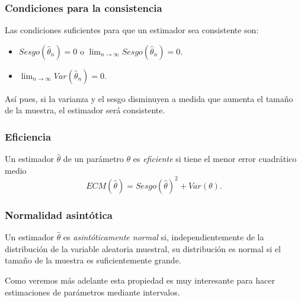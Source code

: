 \begin{frame}
\frametitle{Condiciones para la consistencia}
Las condiciones suficientes para que un estimador sea consistente son:
\begin{itemize}
\item $Sesgo(\hat \theta_n)=0$ o $\lim_{n\rightarrow \infty}Sesgo(\hat \theta_n)=0$.
\item $\lim_{n\rightarrow \infty}Var(\hat \theta_n)=0$.
\end{itemize}
Así pues, si la varianza y el sesgo disminuyen a medida que aumenta el tamaño de la muestra, el estimador será consistente.
\end{frame}


\begin{frame}
\frametitle{Eficiencia}
\begin{definicion}
Un estimador $\hat \theta$ de un parámetro $\theta$ es \emph{eficiente} si tiene el menor error cuadrático medio
\[
ECM(\hat \theta) = Sesgo(\hat \theta)^2+Var(\theta).
\]
\end{definicion}
\begin{center}
\scalebox{0.7}{}
\end{center}
\end{frame}


\begin{frame}
\frametitle{Normalidad asintótica}
\begin{definicion}
Un estimador $\hat \theta$ es \emph{asintóticamente normal} si, independientemente de la distribución de la variable aleatoria muestral, su distribución es normal si el tamaño de la muestra es suficientemente grande.
\end{definicion}
\begin{center}
\scalebox{0.7}{}
\end{center}
Como veremos más adelante esta propiedad es muy interesante para hacer estimaciones de parámetros mediante intervalos.
\end{frame}



